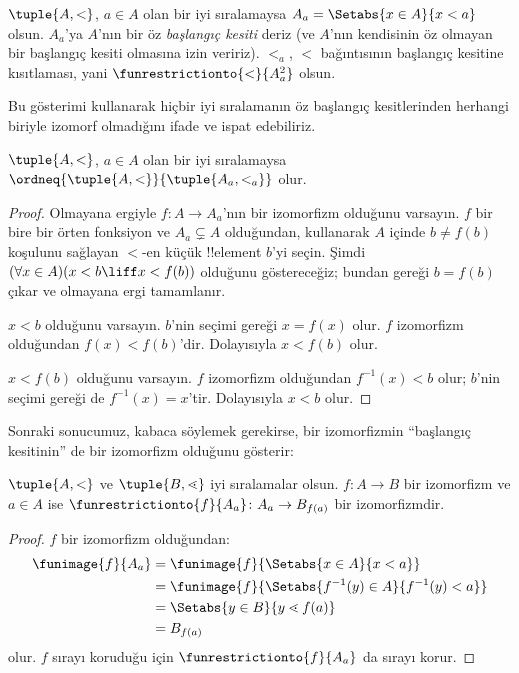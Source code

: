 \documentclass[../../../include/open-logic-section]{subfiles}
\begin{document}
\begin{defn}
$\tuple{A,<}$, $a\in A$ olan bir iyi sıralamaysa
$A_a=\Setabs{x\in A}{x<a}$ olsun. $A_a$'ya $A$'nın bir öz
\emph{başlangıç kesiti} deriz (ve $A$'nın kendisinin öz olmayan bir
başlangıç kesiti olmasına izin veririz). $<_a$, $<$ bağıntısının başlangıç
kesitine kısıtlaması, yani $\funrestrictionto{\mathord{<}}{A_a^2}$ olsun.
\end{defn}
\noindent
Bu gösterimi kullanarak hiçbir iyi sıralamanın öz başlangıç kesitlerinden
herhangi biriyle izomorf olmadığını ifade ve ispat edebiliriz.

\begin{lem}
$\tuple{A,<}$, $a\in A$ olan bir iyi sıralamaysa
$\ordneq{\tuple{A,<}}{\tuple{A_a,<_a}}$ olur.
\end{lem}

\begin{proof}
Olmayana ergiyle $f\colon A\to A_a$'nın bir izomorfizm olduğunu varsayın.
$f$ bir bire bir örten fonksiyon ve $A_a\subsetneq A$ olduğundan,
 kullanarak $A$ içinde $b\neq f(b)$ koşulunu
sağlayan $<$-en küçük !!{element} $b$'yi seçin. Şimdi
$(\forall x\in A)(x<b\liff x<f(b))$ olduğunu göstereceğiz; bundan
 gereği
$b=f(b)$ çıkar ve olmayana ergi tamamlanır.

$x<b$ olduğunu varsayın. $b$'nin seçimi gereği $x=f(x)$ olur. $f$
izomorfizm olduğundan $f(x)<f(b)$'dir. Dolayısıyla $x<f(b)$ olur.

$x<f(b)$ olduğunu varsayın. $f$ izomorfizm olduğundan $f^{-1}(x)<b$ olur;
$b$'nin seçimi gereği de $f^{-1}(x)=x$'tir. Dolayısıyla $x<b$ olur.
\end{proof}

Sonraki sonucumuz, kabaca söylemek gerekirse, bir izomorfizmin ``başlangıç
kesitinin'' de bir izomorfizm olduğunu gösterir:

\begin{lem}
$\tuple{A,<}$ ve $\tuple{B,\lessdot}$ iyi sıralamalar olsun.
$f\colon A\to B$ bir izomorfizm ve $a\in A$ ise
$\funrestrictionto{f}{A_a}\colon A_a\to B_{f(a)}$ bir izomorfizmdir.
\end{lem}

\begin{proof}
$f$ bir izomorfizm olduğundan:
\begin{align*}
	\funimage{f}{A_a} &= \funimage{f}{\Setabs{x \in A}{x < a}}\\
	&= \funimage{f}{\Setabs{f^{-1}(y) \in A}{f^{-1}(y) < a}} \\
	&= \Setabs{y \in B}{y \lessdot f(a)} \\
	&=B_{f(a)}
\end{align*}
olur. $f$ sırayı koruduğu için $\funrestrictionto{f}{A_a}$ da sırayı korur.
\end{proof}
\end{document}
